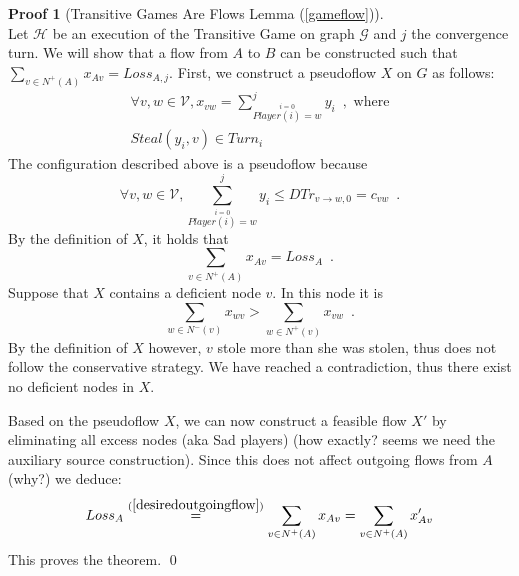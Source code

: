 \documentclass[11pt]{llncs}
\theoremstyle{definition}
\newtheorem{sepproof}{Proof}
\begin{document}
    \begin{sepproof}[Transitive Games Are Flows Lemma (\ref{gameflow})] \ \\
       Let $\mathcal{H}$ be an execution of the Transitive Game on graph $\mathcal{G}$ and $j$ the convergence turn. We will
       show that a flow from $A$ to $B$ can be constructed such that $\sum\limits_{v \in N^{+}\left(A\right)}x_{Av} =
       Loss_{A, j}$. First, we construct a pseudoflow $X$ on $G$ as follows:
       \begin{equation*}
       \begin{gathered}
          \forall v, w \in \mathcal{V}, x_{vw} = \sum\limits_{\overset{i = 0}{Player\left(i\right) = w}}^jy_i \enspace,
          \mbox{ where}\\
          Steal(y_i, v) \in Turn_i
       \end{gathered}
       \end{equation*}
       The configuration described above is a pseudoflow \cite{amo} because 
       \begin{equation*}
           \forall v,w \in \mathcal{V}, \sum\limits_{\overset{i = 0}{Player\left(i\right) = w}}^jy_i \leq
           DTr_{v \rightarrow w, 0} = c_{vw} \enspace.
       \end{equation*}
       By the definition of $X$, it holds that
       \begin{equation}
       \label{desiredoutgoingflow}
           \sum\limits_{v \in N^{+}\left(A\right)}x_{Av} = Loss_A \enspace.
       \end{equation}
       Suppose that $X$ contains a deficient node $v$. In this node it is
       \begin{equation*}
          \sum\limits_{w \in N^{-}\left(v\right)}x_{wv} > \sum\limits_{w \in N^{+}\left(v\right)}x_{vw} \enspace.
       \end{equation*}
       By the definition of $X$ however, $v$ stole more than she was stolen, thus does not follow the conservative strategy.
       We have reached a contradiction, thus there exist no deficient nodes in $X$.\

       Based on the pseudoflow $X$, we can now construct a feasible flow $X'$ by eliminating all excess nodes (aka Sad players) (how exactly? seems we need the
       auxiliary source construction). Since this does not affect outgoing flows from $A$ (why?) we deduce:
       \begin{equation*}
          Loss_A \overset{(\ref{desiredoutgoingflow})}{=} \sum\limits_{v \in N^{+}\left(A\right)}x_{Av} =
          \sum\limits_{v \in N^{+}(A)}x'_{Av}
       \end{equation*}
       This proves the theorem. \qed
    \end{sepproof}
\end{document}
